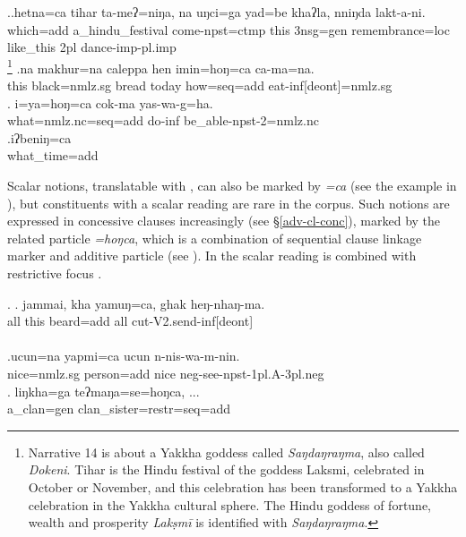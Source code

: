 \ex.\ag.hetna=ca  tihar ta-meʔ=niŋa,  na uŋci=ga    yad=be khaʔla,   nniŋda lakt-a-ni.\\
which{\sc =add} a\_hindu\_festival come{\sc [3sg]-npst=ctmp} this {\sc 3nsg=gen} remembrance{\sc =loc} like\_this {\sc 2pl} dance{\sc -imp-pl.imp}\\
\footnote{Narrative 14 is about a Yakkha goddess called \emph{Saŋdaŋraŋma}, also called \emph{Dokeni}. Tihar is the Hindu festival of the goddess Laksmi, celebrated in October or November, and this celebration  has been transformed to a Yakkha celebration in the Yakkha cultural sphere. The Hindu goddess of fortune, wealth  and prosperity \emph{Lakṣmī } is identified with \emph{Saŋdaŋraŋma}.}
\bg.na   makhur=na        caleppa hen   imin=hoŋ=ca          ca-ma=na.\\
this black{\sc =nmlz.sg} bread today how{\sc =seq=add} eat{\sc -inf[deont]=nmlz.sg}\\
 
\bg. i=ya=hoŋ=ca                       cok-ma     yas-wa-g=ha.\\
what{\sc =nmlz.nc=seq=add} do{\sc -inf} be\_able{\sc -npst-2=nmlz.nc}\\
 
 \bg.iʔbeniŋ=ca\\
 what\_time{\sc =add}\\
  
  
 Scalar notions,  translatable with , can also be marked by \emph{=ca} (see the example in \Next), but constituents with a  scalar reading are rare in the corpus. Such notions are expressed in concessive clauses increasingly (see §\ref{adv-cl-conc}), marked by the related particle \emph{=hoŋca}, which is a combination of sequential clause linkage marker and additive particle (see \Next[c]). In \Next[c] the scalar reading is combined with restrictive focus . 
 
 \ex. \ag.      jammai, kha  yamuŋ=ca,       ghak heŋ-nhaŋ-ma. \\
 all this beard{\sc =add} all cut{\sc -V2.send-inf[deont]}\\
   \\
 \bg.ucun=na        yapmi=ca         ucun n-nis-wa-m-nin.\\
 nice{\sc =nmlz.sg} person{\sc =add} nice {\sc neg-}see{\sc -npst-1pl.A-3pl.neg}\\
   
 \bg. liŋkha=ga      teʔmaŋa=se=hoŋca, ...\\
 a\_clan{\sc =gen} clan\_sister{\sc =restr=seq=add}\\
  
 
